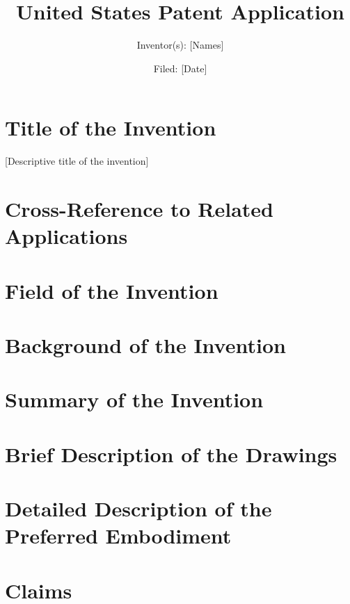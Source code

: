 \documentclass[12pt]{article}
\title{United States Patent Application}
\author{Inventor(s): [Names]}
\date{Filed: [Date]}
\begin{document}
\maketitle

\section{Title of the Invention}
[Descriptive title of the invention]

\section{Cross-Reference to Related Applications}

\section{Field of the Invention}

\section{Background of the Invention}

\section{Summary of the Invention}

\section{Brief Description of the Drawings}

\section{Detailed Description of the Preferred Embodiment}

\section{Claims}
\end{document}
